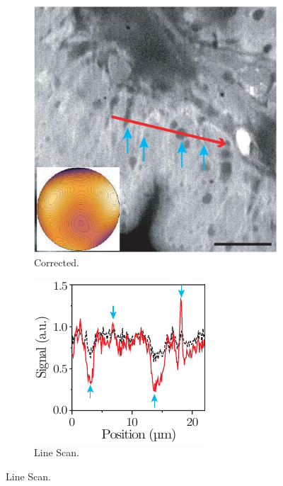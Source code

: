 \begin{figure}[htb]
\begin{subfigure}[b]{0.25\textwidth}
                \includegraphics[width=\textwidth]{images/structured_illumination_corrected}
                \caption{Corrected.}
                \label{fig:SI_corrected}
        \end{subfigure}
        \begin{subfigure}[b]{0.25\textwidth}
                \includegraphics[width=\textwidth]{images/structured_illumination_scan}
                \caption{Line Scan.}
                \label{fig:SI_scan}
        \end{subfigure}
								

\end{figure}
